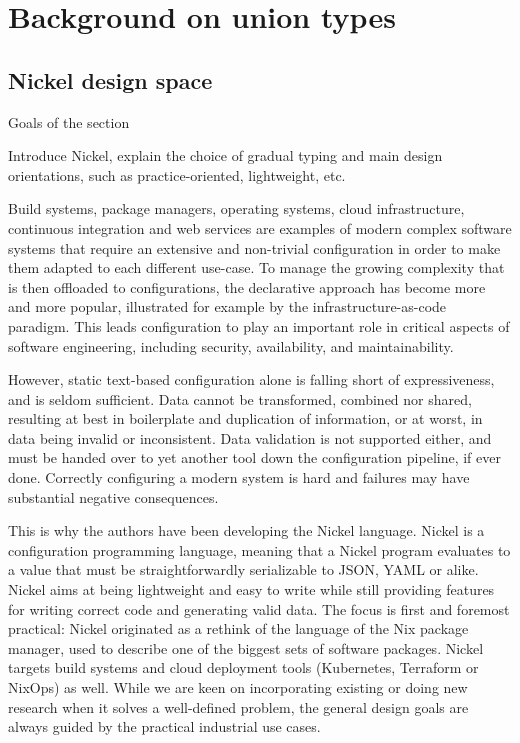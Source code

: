 \appendix


\section{Background on union types}

\subsection{Nickel design space}

{\color{red}Goals of the section

Introduce Nickel, explain the choice of gradual
typing and main design orientations, such as practice-oriented, lightweight,
etc.\vspace{0.5cm}}

Build systems, package managers, operating systems, cloud infrastructure,
continuous integration and web services
are examples of modern complex software systems that require an extensive and
non-trivial configuration in order to make them adapted to each different
use-case. To manage the growing complexity that is then offloaded to
configurations, the declarative approach has become more and more popular,
illustrated for example by the infrastructure-as-code paradigm. This leads
configuration to play an important role in critical aspects of software
engineering, including security, availability, and maintainability.

However, static text-based configuration alone is falling short of
expressiveness, and is seldom sufficient. Data cannot be transformed, combined
nor shared, resulting at best in boilerplate and duplication of information, or
at worst, in data being invalid or inconsistent. Data validation is not
supported either, and must be handed over to yet another tool down the
configuration pipeline, if ever done. Correctly configuring a modern system is
hard and failures may have substantial negative consequences.

This is why the authors have been developing the Nickel
language\cite{NickelRepo}. Nickel is a configuration programming language,
meaning that a Nickel program evaluates to a value that must be
straightforwardly serializable to JSON, YAML or alike. Nickel aims at being
lightweight and easy to write while still providing features for writing correct
code and generating valid data. The focus is first and foremost practical:
Nickel originated as a rethink of the language of the Nix package manager, used
to describe one of the biggest sets of software packages\cite{repology}.  Nickel
targets build systems and cloud deployment tools (Kubernetes, Terraform or
NixOps) as well. While we are keen on incorporating existing or doing new
research when it solves a well-defined problem, the general design goals are
always guided by the practical industrial use cases.

